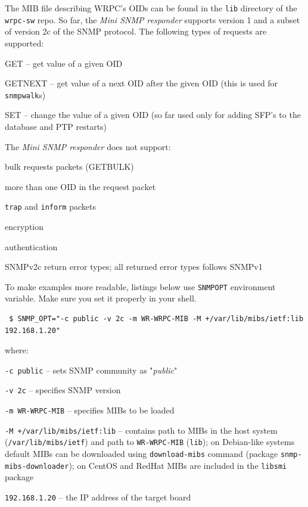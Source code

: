 \documentclass[a4paper, 12pt]{article}
\renewcommand{\_}{\underscore\allowbreak}
\begin{document}
The MIB file describing WRPC's OIDs can be found in the \texttt{lib} directory
of the \texttt{wrpc-sw} repo.
So far, the \textit{Mini SNMP responder} supports version 1 and a subset of version
2c of the SNMP protocol.
The following types of requests are supported:
\begin{itemize*}
   \item GET -- get value of a given OID
   \item GETNEXT -- get value of a next OID after the given OID (this is used
         for \texttt{snmpwalk}s)
   \item SET -- change the value of a given OID (so far used only for adding
         SFP's to the database and PTP restarts)
\end{itemize*}
The \textit{Mini SNMP responder} does not support:
\begin{itemize*}
   \item bulk requests packets (GETBULK)
   \item more than one OID in the request packet
   \item \texttt{trap} and \texttt{inform} packets
   \item encryption
   \item authentication
   \item SNMPv2c return error types; all returned error types follows SNMPv1
\end{itemize*}
To make examples more readable, listings below use \texttt{SNMP\_OPT} environment
variable. Make sure you set it properly in your shell.
\begin{lstlisting}
 $ SNMP_OPT="-c public -v 2c -m WR-WRPC-MIB -M +/var/lib/mibs/ietf:lib 192.168.1.20"
\end{lstlisting}
where:
\begin{sloppypar} %
\begin{itemize*}
   \item \texttt{-c public} -- sets SNMP community as "\textit{public}"
   \item \texttt{-v 2c} -- specifies SNMP version
   \item \texttt{-m WR-WRPC-MIB} -- specifies MIBs to be loaded
   \item \texttt{-M +/var/lib/mibs/ietf:lib} -- contains path to MIBs in the host
         system (\texttt{/var/lib/mibs/ietf}) and path to \texttt{WR-WRPC-MIB} (\texttt{lib});
         on Debian-like systems default MIBs can be downloaded using
         \texttt{download-mibs} command (package \texttt{snmp-mibs-downloader}); on
         CentOS and RedHat MIBs are included in the \texttt{libsmi} package
   \item \texttt{192.168.1.20} -- the IP address of the target board
\end{itemize*}\end{sloppypar}\noindent
\end{document}
